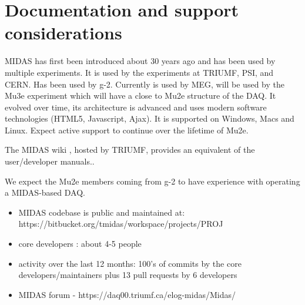 \section{Documentation and support considerations}

MIDAS has first been introduced about 30 years ago and has been used
by multiple experiments. It is used by the experiments at TRIUMF, PSI,
and CERN. Has been used by g-2. Currently is used by MEG, will be used by
the Mu3e experiment which will have
a close to Mu2e structure of the DAQ.
It evolved over time, its architecture is advanced and uses modern software
technologies (HTML5, Javascript, Ajax).
It is supported on Windows, Macs and Linux.
Expect active support to continue over the lifetime of Mu2e.

The MIDAS wiki \cite{2025_MIDAS_WIKI}, hosted by TRIUMF, provides an equivalent
of the user/developer manuals..

We expect the Mu2e members coming from g-2 to have experience with operating
a MIDAS-based DAQ.

\begin{itemize}
\item 
  MIDAS codebase is public and maintained at: https://bitbucket.org/tmidas/workspace/projects/PROJ
\item
  core developers : about 4-5 people
\item
  activity over the last 12 months: 100's of commits by the core developers/maintainers plus
  13 pull requests by 6 developers
\item 
  MIDAS forum - https://daq00.triumf.ca/elog-midas/Midas/
\end{itemize}




